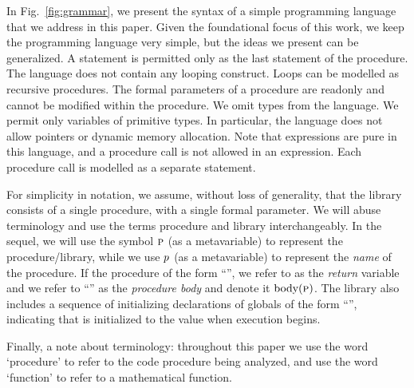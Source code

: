 In Fig.~\ref{fig:grammar}, we present the syntax of a simple
programming language that we address in this paper.
Given the foundational focus of this work, we keep the programming
language very simple, but the ideas we present can be generalized.
A  statement is permitted only as the last statement of
the procedure.
The language does not contain any looping construct.
Loops can be modelled as recursive procedures.
The formal parameters of a procedure are readonly and cannot be
modified within the procedure.
We omit types from the language. We permit only variables of primitive types.
In particular, the language does not allow pointers or dynamic memory allocation.
Note that expressions are pure in this language, and a procedure call
is not allowed in an expression. Each procedure call is modelled as a
separate statement.

For simplicity in notation, we assume, without loss of generality,
that the library consists of a single procedure, with a single formal
parameter. We will abuse terminology and use the terms procedure and library interchangeably.
In the sequel, we will use the symbol $\textsc{p}$ (as a metavariable) to represent the procedure/library,
while we use $p$ (as a metavariable) to represent the \emph{name} of the procedure.
If the procedure of the form ``'', we refer to  as the \emph{return}
variable and we refer to ``'' as the \emph{procedure body} and denote it $\text{body}(\textsc{p})$.
The library also includes a sequence of initializing declarations of globals of the form ``'', indicating
that  is initialized to the value  when execution begins.

 Finally, a note about terminology: throughout this paper we
use the word `procedure' to refer to the code procedure being analyzed, and use the word
`function' to refer to a mathematical function.
